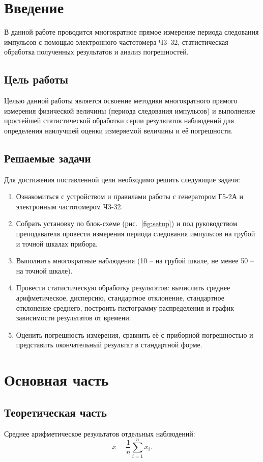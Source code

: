\section{Введение}
В данной работе проводится многократное прямое измерение периода следования импульсов с помощью электронного частотомера Ч3–32, статистическая обработка полученных результатов и анализ погрешностей.

\subsection{Цель работы}

Целью данной работы является освоение методики многократного прямого измерения физической величины (периода следования импульсов) и выполнение простейшей статистической обработки серии результатов наблюдений для определения наилучшей оценки измеряемой величины и её погрешности.

\subsection{Решаемые задачи}
Для достижения поставленной цели необходимо решить следующие задачи:
\begin{enumerate}
    \item Ознакомиться с устройством и правилами работы с генератором Г5-2А и электронным частотомером Ч3-32.
    \item Собрать установку по блок-схеме (рис.~\ref{fig:setup}) и под руководством преподавателя провести измерения периода следования импульсов на грубой и точной шкалах прибора.
    \item Выполнить многократные наблюдения (10 – на грубой шкале, не менее 50 – на точной шкале).
    \item Провести статистическую обработку результатов: вычислить среднее арифметическое, дисперсию, стандартное отклонение, стандартное отклонение среднего, построить гистограмму распределения и график зависимости результатов от времени.
    \item Оценить погрешность измерения, сравнить её с приборной погрешностью и представить окончательный результат в стандартной форме.
\end{enumerate}

\section{Основная часть}

\subsection{Теоретическая часть}
Среднее арифметическое результатов отдельных наблюдений:
\begin{equation}
    \overline{x} = \frac{1}{n}\sum_{i=1}^{n} x_i .
    \label{eq:mean}
\end{equation}

